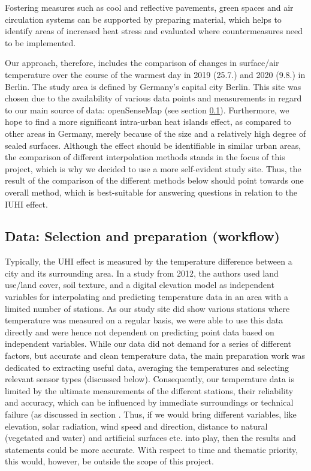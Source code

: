 Fostering measures such as cool and reflective pavements, green spaces and air circulation systems \cite{mohajerani_urban_2017} can be supported by preparing material, which helps to identify areas of increased heat stress and evaluated where countermeasures need to be implemented.

Our approach, therefore, includes the comparison of changes in surface/air temperature over the course of the warmest day in 2019 (25.7.) and 2020 (9.8.) in Berlin. The study area is defined by Germany’s capital city Berlin. This site was chosen due to the availability of various data points and measurements in regard to our main source of data: openSenseMap (see section \ref{sec:data}). Furthermore, we hope to find a more significant intra-urban heat islands effect, as compared to other areas in Germany, merely because of the size and a relatively high degree of sealed surfaces. \cite{gdv_munchen_2018} Although the effect should be identifiable in similar urban areas, the comparison of different interpolation methods stands in the focus of this project, which is why we decided to use a more self-evident study site. Thus, the result of the comparison of the different methods below should point towards one overall method, which is best-suitable for answering questions in relation to the IUHI effect. 

\subsection{Data: Selection and preparation (workflow)}
\label{sec:data}

Typically, the UHI effect is measured by the temperature difference between a city and its surrounding area.\cite{us_epa_learn_2014} In a study from 2012, the authors used land use/land cover, soil texture, and a digital elevation model as independent variables for interpolating and predicting temperature data in an area with a limited number of stations.\cite{samanta_interpolation_2012} As our study site did show various stations where temperature was measured on a regular basis, we were able to use this data directly and were hence not dependent on predicting point data based on independent variables. While our data did not demand for a series of different factors, but accurate and \ldq{}clean\rdq{} temperature data, the main preparation work was dedicated to extracting useful data, averaging the temperatures and selecting relevant sensor types (discussed below). Consequently, our temperature data is limited by the ultimate measurements of the different stations, their reliability and accuracy, which can be influenced by immediate surroundings or technical failure (as discussed in section
. Thus, if we would bring different variables, like elevation, solar radiation, wind speed and direction, distance to natural (vegetated and water) and artificial surfaces etc. into play, then the results and statements could be more accurate. With respect to time and thematic priority, this would, however, be outside the scope of this project.

